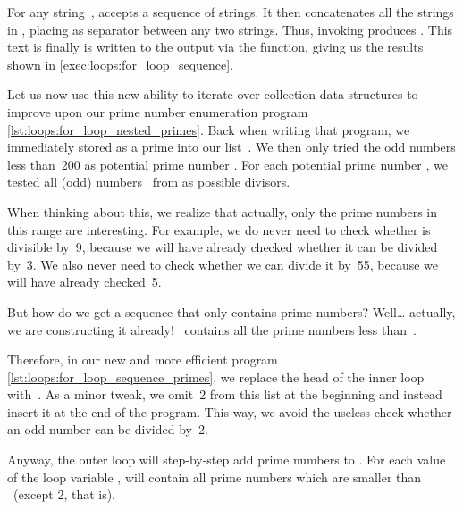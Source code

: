 For any string~,  accepts a sequence  of strings.
It then concatenates all the strings in , placing  as separator between any two strings.
Thus, invoking  produces .
This text is finally is written to the output via the  function, giving us the results shown in  \cref{exec:loops:for_loop_sequence}.

%

Let us now use this new ability to iterate over collection data structures to improve upon our prime number enumeration program \cref{lst:loops:for_loop_nested_primes}.
Back when writing that program, we immediately stored  as a prime into our list~.
We then only tried the odd numbers less than~200 as potential prime number .
For each potential prime number , we tested all (odd) numbers~ from  as possible divisors.

When thinking about this, we realize that actually, only the prime numbers in this range are interesting.
For example, we do never need to check whether  is divisible by~9, because we will have already checked whether it can be divided by~3.
We also never need to check whether we can divide it by~55, because we will have already checked~5.

But how do we get a sequence that only contains prime numbers?
Well{\dots} actually, we are constructing it already!
~contains all the prime numbers less than~.

Therefore, in our new and more efficient program \cref{lst:loops:for_loop_sequence_primes}, we replace the head of the inner loop with~.
As a minor tweak, we omit~2 from this list at the beginning and instead insert it at the end of the program.
This way, we avoid the useless check whether an odd number  can be divided by~2.

Anyway, the outer loop will step-by-step add prime numbers to .
For each value of the loop variable ,  will contain all prime numbers which are smaller than ~(except 2, that is).

